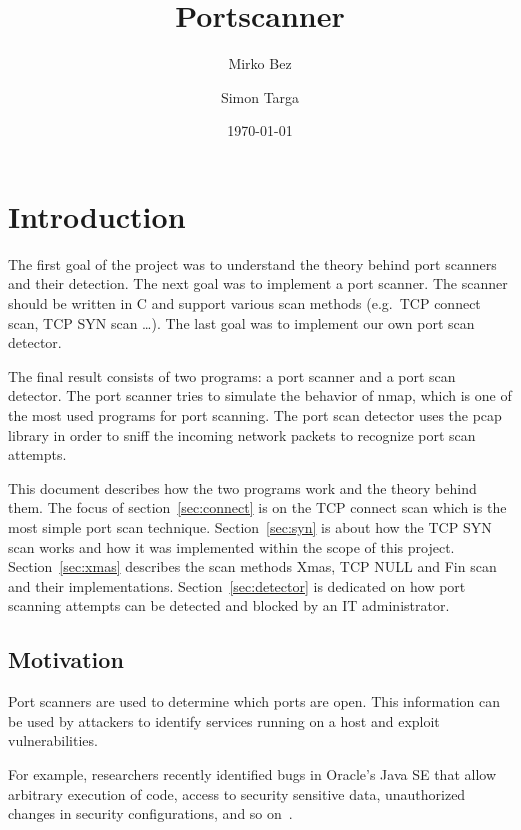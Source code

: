 \documentclass[a4paper]{scrreprt}
\begin{document}
\title{Portscanner}
\author{Mirko Bez \and Simon Targa} 
\date{\today}
\maketitle
\tableofcontents
\newpage



\chapter*{Introduction}
The first goal of the project was to understand the theory behind port scanners and their detection. The next goal was to implement a port scanner. The scanner should be written in C and support various scan methods (e.g.\ TCP connect scan, TCP SYN scan \dots). The last goal
was to implement our own port scan detector. 

The final result consists of two programs: a port scanner and a port scan detector.
The port scanner tries to simulate the behavior of nmap, which is one of the most used
programs for port scanning. The port scan detector uses the pcap library in order to sniff
the incoming network packets to recognize port scan attempts.

This document describes how the two programs work and the theory behind them.
The focus of section~\ref{sec:connect} is on the TCP connect scan which is the most simple port scan technique. 
Section~\ref{sec:syn} is about how the TCP SYN scan works and how it was implemented within the scope of this project. Section~\ref{sec:xmas} describes the scan methods Xmas, TCP NULL and Fin scan and their
implementations. Section~\ref{sec:detector} is dedicated on how port scanning attempts can be detected and blocked by an IT administrator.

\section*{Motivation}
Port scanners are used to determine which ports are open. This information can be used by
attackers to identify services running on a host and exploit vulnerabilities. 


For example, researchers recently identified bugs in Oracle’s Java SE that allow arbitrary execution of code, access to security sensitive data, unauthorized changes in security configurations, and so on~\cite{dangerports}.




\end{document}
